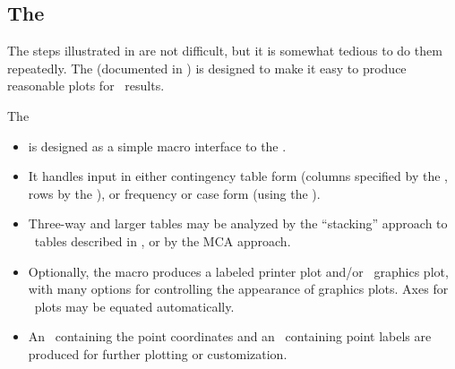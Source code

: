 \subsection{The }\label{sec:ca-camacro}

The steps illustrated in  are not difficult, but it is somewhat tedious to do them repeatedly.
The  (documented in )
is designed to make it easy to produce reasonable plots for \CA\
results.

The 
\begin{itemize}
\item is designed as a simple macro interface to the .

\item It handles input in either contingency table form
(columns specified by the , rows by the
), or frequency or case form 
(using the ).

\item Three-way and larger tables may be analyzed by the ``stacking''
approach to
\mway\ tables described in , or by
the MCA approach.

\item Optionally, the macro produces a labeled printer plot and/or
\hires\ graphics plot, with many options for controlling the appearance
of graphics plots.
Axes for \hires\ plots may be equated automatically.
\item An \ODS\ containing the point coordinates and an \ADS\ containing point labels
are produced for further plotting or customization.
\end{itemize}

